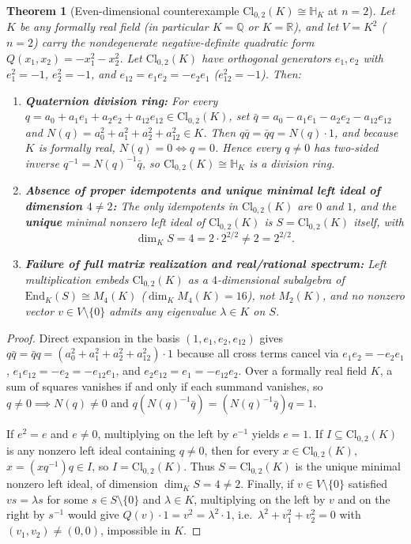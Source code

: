 \documentclass[11pt,a4paper]{article}
\theoremstyle{plain}
\newtheorem{theorem}{Theorem}[section]
\theoremstyle{definition}
\theoremstyle{remark}
\newcommand{\Cl}{\mathrm{Cl}}
\newcommand{\End}{\mathrm{End}}
\begin{document}
\begin{theorem}[Even-dimensional counterexample $\Cl_{0,2}(K) \cong \mathbb{H}_K$ at $n = 2$]\label{thm:cl02}
Let $K$ be any formally real field (in particular $K = \mathbb{Q}$ or $K = \mathbb{R}$), and let $V = K^2$ ($n = 2$) carry the nondegenerate negative-definite quadratic form $Q(x_1, x_2) = -x_1^2 - x_2^2$. Let $\Cl_{0,2}(K)$ have orthogonal generators $e_1, e_2$ with $e_1^2 = -1$, $e_2^2 = -1$, and $e_{12} = e_1 e_2 = -e_2 e_1$ ($e_{12}^2 = -1$). Then:
\begin{enumerate}
  \item \textbf{Quaternion division ring:} For every $q = a_0 + a_1 e_1 + a_2 e_2 + a_{12} e_{12} \in \Cl_{0,2}(K)$, set $\bar{q} = a_0 - a_1 e_1 - a_2 e_2 - a_{12} e_{12}$ and $N(q) = a_0^2 + a_1^2 + a_2^2 + a_{12}^2 \in K$. Then $q \bar{q} = \bar{q} q = N(q) \cdot 1$, and because $K$ is formally real, $N(q) = 0 \iff q = 0$. Hence every $q \neq 0$ has two-sided inverse $q^{-1} = N(q)^{-1}\bar{q}$, so $\Cl_{0,2}(K) \cong \mathbb{H}_K$ is a division ring.
  \item \textbf{Absence of proper idempotents and unique minimal left ideal of dimension $4 \neq 2$:} The only idempotents in $\Cl_{0,2}(K)$ are $0$ and $1$, and the \textbf{unique} minimal nonzero left ideal of $\Cl_{0,2}(K)$ is $S = \Cl_{0,2}(K)$ itself, with
  \[
    \dim_K S = 4 = 2 \cdot 2^{2/2} \neq 2 = 2^{2/2}.
  \]
  \item \textbf{Failure of full matrix realization and real/rational spectrum:} Left multiplication embeds $\Cl_{0,2}(K)$ as a $4$-dimensional subalgebra of $\End_K(S) \cong M_4(K)$ ($\dim_K M_4(K) = 16$), not $M_2(K)$, and no nonzero vector $v \in V \setminus \{0\}$ admits any eigenvalue $\lambda \in K$ on $S$.
\end{enumerate}
\end{theorem}

\begin{proof}
Direct expansion in the basis $(1, e_1, e_2, e_{12})$ gives $q \bar{q} = \bar{q} q = (a_0^2 + a_1^2 + a_2^2 + a_{12}^2)\cdot 1$ because all cross terms cancel via $e_1 e_2 = -e_2 e_1$, $e_1 e_{12} = -e_2 = -e_{12} e_1$, and $e_2 e_{12} = e_1 = -e_{12} e_2$. Over a formally real field $K$, a sum of squares vanishes if and only if each summand vanishes, so $q \neq 0 \implies N(q) \neq 0$ and $q (N(q)^{-1}\bar{q}) = (N(q)^{-1}\bar{q}) q = 1$.

If $e^2 = e$ and $e \neq 0$, multiplying on the left by $e^{-1}$ yields $e = 1$. If $I \subseteq \Cl_{0,2}(K)$ is any nonzero left ideal containing $q \neq 0$, then for every $x \in \Cl_{0,2}(K)$, $x = (x q^{-1}) q \in I$, so $I = \Cl_{0,2}(K)$. Thus $S = \Cl_{0,2}(K)$ is the unique minimal nonzero left ideal, of dimension $\dim_K S = 4 \neq 2$. Finally, if $v \in V \setminus \{0\}$ satisfied $v s = \lambda s$ for some $s \in S \setminus \{0\}$ and $\lambda \in K$, multiplying on the left by $v$ and on the right by $s^{-1}$ would give $Q(v)\cdot 1 = v^2 = \lambda^2 \cdot 1$, i.e.\ $\lambda^2 + v_1^2 + v_2^2 = 0$ with $(v_1, v_2) \neq (0,0)$, impossible in $K$.
\end{proof}
\end{document}
